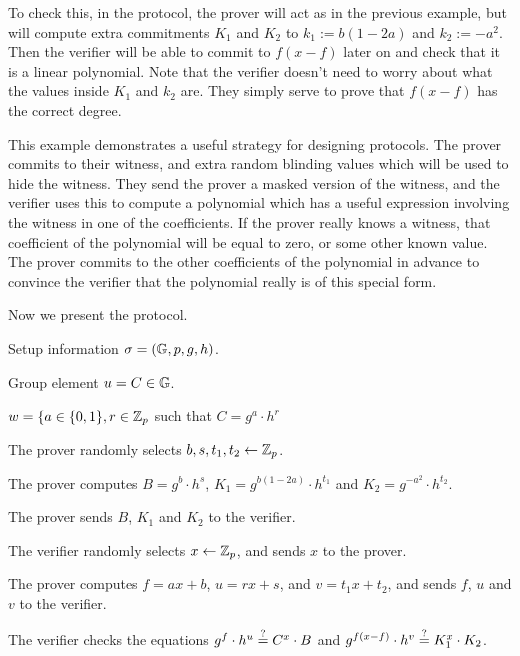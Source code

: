 To check this, in the protocol, the prover will act as in the previous example, but will compute extra commitments $K_1$ and $K_2$ to $k_1 := b(1-2a)$ and $k_2 := -a^2$. Then the verifier will be able to commit to $f(x-f)$ later on and check that it is a linear polynomial. Note that the verifier doesn't need to worry about what the values inside $K_1$ and $k_2$ are. They simply serve to prove that $f(x-f)$ has the correct degree.

This example demonstrates a useful strategy for designing protocols. The prover commits to their witness, and extra random blinding values which will be used to hide the witness. They send the prover a masked version of the witness, and the verifier uses this to compute a polynomial which has a useful expression involving the witness in one of the coefficients. If the prover really knows a witness, that coefficient of the polynomial will be equal to zero, or some other known value. The prover commits to the other coefficients of the polynomial in advance to convince the verifier that the polynomial really is of this special form.

Now we present the protocol.

\begin{description}\label{prot:combits}
\item[Common input:] Setup information $\mathsf{\sigma} = (\mathbb{G},p,g,h)$.
\item [Instance:] Group element $u = C \in \mathbb{G}$.
\item[Prover's witness:] $w = \lbrace a \in \lbrace 0,1 \rbrace, r \in \mathbb{Z}_p$ such that $C = g^a \cdot h^r$
\item[Protocol:]
\item[\ P:] The prover randomly selects $b,s,t_1,t_2 \gets \mathbb{Z}_p$.

The prover computes $B = g^b \cdot h^s$, $K_1 = g^{b(1-2a)} \cdot h^{t_1}$ and $K_2 = g^{-a^2} \cdot h^{t_2}$.

The prover sends $B$, $K_1$ and $K_2$ to the verifier.

\item[\ V:] The verifier randomly selects $x\gets \mathbb{Z}_p$, and sends $x$ to the prover.

\item[\ P:] The prover computes $f = ax + b$, $u = rx+s$, and $v = t_1 x + t_2$, and sends $f$, $u$ and $v$ to the verifier.

\item[\ V:] The verifier checks the equations $g^f \cdot h^u \overset{?}{=} C^x \cdot B$ and $g^{f(x-f)} \cdot h^v \overset{?}{=} K_1^x \cdot K_2$.
\end{description}

